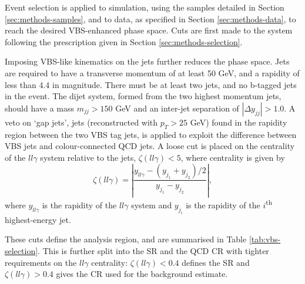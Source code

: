 
Event selection is applied to simulation, using the samples detailed in Section
\ref{sec:methods-samples}, and to data, as specified in Section
\ref{sec:methods-data}, to reach the desired \ac{VBS}-enhanced phase
space. Cuts are first made to the \Zy system following the prescription given in
Section \ref{sec:methods-selection}.

Imposing \ac{VBS}-like kinematics on the jets further reduces the phase space.
Jets are required to have a transverse momentum of at least 50 GeV, and a
rapidity of less than 4.4 in magnitude. There must be at least two jets, and no
b-tagged jets in the event. The dijet system, formed from the two highest
momentum jets, should have a mass $m_{jj} > 150$ GeV and an inter-jet separation
of $|\Delta y_{jj}| > 1.0$. A veto on `gap jets', jets
(reconstructed with $p_T > 25$ GeV) found in the rapidity region between the two
VBS tag jets, is applied to exploit the difference between VBS jets and
colour-connected \ac{QCD} jets. A loose cut is placed on the centrality of the
$ll\gamma$ system relative to the jets, $\zeta(ll\gamma) < 5$, where centrality
is given by
%
\begin{equation}
  \zeta(ll\gamma) = \left|
                      \frac { y_{ll\gamma} - (y_{j_1} + y_{j_2})/2}
                            { y_{j_1} - y_{j_2} }
                    \right|,
  \label{eqn:vbs-selection-centrality}
\end{equation}
%
where $y_{ll\gamma}$ is the rapidity of the $ll\gamma$ system and $y_{j_i}$ is
the rapidity of the $i$\textsuperscript{th} highest-energy jet.

These cuts define the analysis region, and are summarised in Table
\ref{tab:vbs-selection}.  This is further split into the \ac{SR} and the
\ac{QCD} \ac{CR} with tighter requirements on the $ll\gamma$ centrality:
$\zeta(ll\gamma) < 0.4$ defines the \ac{SR} and $\zeta(ll\gamma) > 0.4$ gives
the \ac{CR} used for the \QCDZy background estimate.

